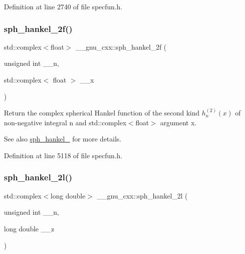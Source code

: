 Definition at line 2740 of file specfun.\+h.

\mbox{\label{group__mathsf__gnu_ga4c3194b71831b265811f987cbbf6e031}} 
\subsubsection{\texorpdfstring{sph\+\_\+hankel\+\_\+2f()}{sph\_hankel\_2f()}\hspace{0.1cm}{\footnotesize\ttfamily [2/2]}}
{\footnotesize\ttfamily std\+::complex$<$float$>$ \+\_\+\+\_\+gnu\+\_\+cxx\+::sph\+\_\+hankel\+\_\+2f (\begin{DoxyParamCaption}\item[{unsigned int}]{\+\_\+\+\_\+n,  }\item[{std\+::complex$<$ float $>$}]{\+\_\+\+\_\+x }\end{DoxyParamCaption})\hspace{0.3cm}{\ttfamily [inline]}}

Return the complex spherical Hankel function of the second kind $ h^{(2)}_n(x) $ of non-\/negative integral {\ttfamily n} and {\ttfamily std\+::complex$<$float$>$} argument {\ttfamily x}.

\begin{DoxySeeAlso}{See also}
\hyperlink{group__mathsf__gnu_ga1ca08866a25e3637b04c57ff5a0c36a5}{sph\+\_\+hankel\+\_} for more details. 
\end{DoxySeeAlso}


Definition at line 5118 of file specfun.\+h.

\mbox{\label{group__mathsf__gnu_ga6d3ead73a4f0bfeeb0aa1fd99daaf3b1}} 
\subsubsection{\texorpdfstring{sph\+\_\+hankel\+\_\+2l()}{sph\_hankel\_2l()}\hspace{0.1cm}{\footnotesize\ttfamily [1/2]}}
{\footnotesize\ttfamily std\+::complex$<$long double$>$ \+\_\+\+\_\+gnu\+\_\+cxx\+::sph\+\_\+hankel\+\_\+2l (\begin{DoxyParamCaption}\item[{unsigned int}]{\+\_\+\+\_\+n,  }\item[{long double}]{\+\_\+\+\_\+z }\end{DoxyParamCaption})\hspace{0.3cm}{\ttfamily [inline]}}

